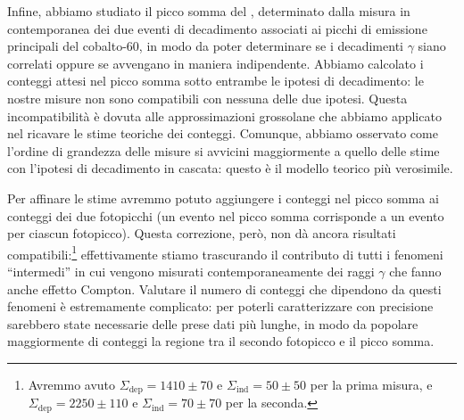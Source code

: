 Infine, abbiamo studiato il picco somma del , determinato dalla misura in contemporanea dei due eventi di decadimento associati ai picchi di emissione principali del cobalto-60, in modo da poter determinare se i decadimenti $ \gamma $ siano correlati oppure se avvengano in maniera indipendente. 
Abbiamo calcolato i conteggi attesi nel picco somma sotto entrambe le ipotesi di decadimento: le nostre misure non sono compatibili con nessuna delle due ipotesi.
Questa incompatibilità è dovuta alle approssimazioni grossolane che abbiamo applicato nel ricavare le stime teoriche dei conteggi.
Comunque, abbiamo osservato come l'ordine di grandezza delle misure si avvicini maggiormente a quello delle stime con l'ipotesi di decadimento in cascata: questo è il modello teorico più verosimile.

Per affinare le stime avremmo potuto aggiungere i conteggi nel picco somma ai conteggi dei due fotopicchi (un evento nel picco somma corrisponde a un evento per ciascun fotopicco).
Questa correzione, però, non dà ancora risultati compatibili:\footnote{Avremmo avuto $ \Sigma_\text{dep} = 1410 \pm 70 $ e $ \Sigma_\text{ind} = 50 \pm 50 $ per la prima misura, e $ \Sigma_\text{dep} = 2250 \pm 110 $ e $ \Sigma_\text{ind} = 70 \pm 70 $ per la seconda.} effettivamente stiamo trascurando il contributo di tutti i fenomeni ``intermedi'' in cui vengono misurati contemporaneamente dei raggi $ \gamma $ che fanno anche effetto Compton.
Valutare il numero di conteggi che dipendono da questi fenomeni è estremamente complicato: per poterli caratterizzare con precisione sarebbero state necessarie delle prese dati più lunghe, in modo da popolare maggiormente di conteggi la regione tra il secondo fotopicco e il picco somma.

